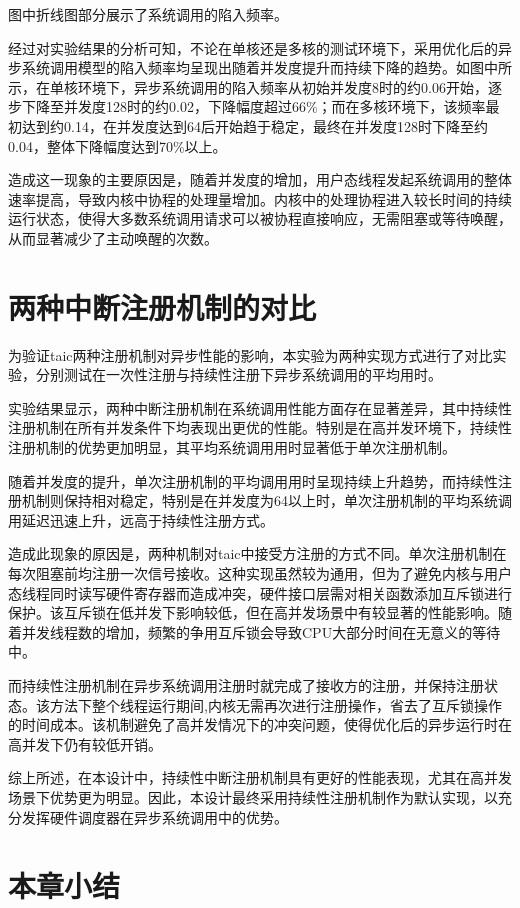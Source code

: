 图中折线图部分展示了系统调用的陷入频率。

经过对实验结果的分析可知，不论在单核还是多核的测试环境下，采用优化后的异步系统调用模型的陷入频率均呈现出随着并发度提升而持续下降的趋势。如图中所示，在单核环境下，异步系统调用的陷入频率从初始并发度8时的约0.06开始，逐步下降至并发度128时的约0.02，下降幅度超过66\%；而在多核环境下，该频率最初达到约0.14，在并发度达到64后开始趋于稳定，最终在并发度128时下降至约0.04，整体下降幅度达到70\%以上。

造成这一现象的主要原因是，随着并发度的增加，用户态线程发起系统调用的整体速率提高，导致内核中协程的处理量增加。内核中的处理协程进入较长时间的持续运行状态，使得大多数系统调用请求可以被协程直接响应，无需阻塞或等待唤醒，从而显著减少了主动唤醒的次数。

\section{两种中断注册机制的对比}

为验证taic两种注册机制对异步性能的影响，本实验为两种实现方式进行了对比实验，分别测试在一次性注册与持续性注册下异步系统调用的平均用时。


实验结果显示，两种中断注册机制在系统调用性能方面存在显著差异，其中持续性注册机制在所有并发条件下均表现出更优的性能。特别是在高并发环境下，持续性注册机制的优势更加明显，其平均系统调用用时显著低于单次注册机制。

随着并发度的提升，单次注册机制的平均调用用时呈现持续上升趋势，而持续性注册机制则保持相对稳定，特别是在并发度为64以上时，单次注册机制的平均系统调用延迟迅速上升，远高于持续性注册方式。

造成此现象的原因是，两种机制对taic中接受方注册的方式不同。单次注册机制在每次阻塞前均注册一次信号接收。这种实现虽然较为通用，但为了避免内核与用户态线程同时读写硬件寄存器而造成冲突，硬件接口层需对相关函数添加互斥锁进行保护。该互斥锁在低并发下影响较低，但在高并发场景中有较显著的性能影响。随着并发线程数的增加，频繁的争用互斥锁会导致CPU大部分时间在无意义的等待中。

而持续性注册机制在异步系统调用注册时就完成了接收方的注册，并保持注册状态。该方法下整个线程运行期间,内核无需再次进行注册操作，省去了互斥锁操作的时间成本。该机制避免了高并发情况下的冲突问题，使得优化后的异步运行时在高并发下仍有较低开销。

综上所述，在本设计中，持续性中断注册机制具有更好的性能表现，尤其在高并发场景下优势更为明显。因此，本设计最终采用持续性注册机制作为默认实现，以充分发挥硬件调度器在异步系统调用中的优势。

\section{本章小结}
